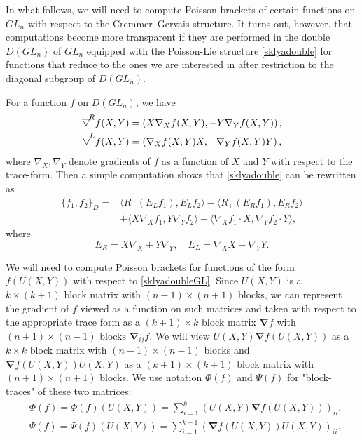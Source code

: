 \documentclass{amsart}
\theoremstyle{definition}
\theoremstyle{remark}
\numberwithin{equation}{section}
\numberwithin{theorem}{section}
\begin{document}
In what follows, we will need to compute Poisson brackets of certain functions
on $GL_n$ with respect to the Cremmer--Gervais structure. It turns out, however, that 
computations become more 
transparent if they are performed in the double $D(GL_n)$  of $GL_n$ equipped with 
the Poisson-Lie structure \eqref{sklyadouble} for functions that reduce to the ones we are interested in
after restriction to the diagonal subgroup of $D(GL_n)$.

For a function $f$ on $D(GL_n)$, we have 
\begin{eqnarray}\nonumber
{{\raisebox{2pt}{$\bigtriangledown$}}\negthinspace}^R f(X,Y) &=\left (X\nabla_X f(X,Y), -Y\nabla_Y f(X,Y)\right ), \\ \nonumber
 {{\raisebox{2pt}{$\bigtriangledown$}}\negthinspace}^L f(X,Y) &=\left (\nabla_X f(X,Y)X, -\nabla_Y f(X,Y)Y\right ),
\end{eqnarray}
where $\nabla_X, \nabla_Y$ denote gradients of $f$ as a function of $X$ and $Y$ with respect to the trace-form. 
Then a simple computation shows that \eqref{sklyadouble} can be rewritten
as
\begin{equation}\label{sklyadoubleGL}
\begin{split}
\{f_1,f_2\}_D = &\langle R_+(E_L f_1), E_L f_2\rangle -  \langle R_+(E_R f_1), E_R f_2\rangle\\
&+  \langle X\nabla_X  f_1, Y\nabla_Y f_2\rangle - \langle\nabla_X  f_1\cdot X, \nabla_Y f_2 \cdot Y\rangle,
\end{split}
\end{equation}
where
\[
E_R = X \nabla_X + Y\nabla_Y, \quad E_L =  \nabla_X X+ \nabla_Y Y.
\]

We will need to compute Poisson brackets for functions of the form
$f(U(X,Y))$ with respect to \eqref{sklyadoubleGL}. Since $U(X,Y)$ is a $k\times (k+1)$ block
matrix with $(n-1)\times (n+1)$ blocks, we can represent the gradient of $f$ viewed as a function on 
such matrices and taken with respect to the appropriate trace form as a $(k+1)\times k$ block
matrix  ${\boldsymbol\nabla} f$ with $(n+1)\times (n-1)$ blocks ${\boldsymbol\nabla}_{ij} f$. 
We will view $U(X,Y) {\boldsymbol\nabla} f(U(X,Y))$ as a $k\times k$ block matrix with $(n-1)\times (n-1)$ blocks
and ${\boldsymbol\nabla} f(U(X,Y)) U(X,Y)$ as a $(k+1)\times (k+1)$ block matrix with $(n+1)\times (n+1)$ blocks. 
We use notation ${\Phi}(f)$ and ${\Psi}(f)$ for "block-traces" of these two matrices:
\begin{equation}\label{blocktrace}
\begin{aligned} 
&{\Phi}(f)={\Phi}(f)(U(X,Y))=\sum_{i=1}^k \left ( U(X,Y) {\boldsymbol\nabla} f(U(X,Y)) \right )_{ii}, \\ 
&{\Psi}(f)={\Psi}(f)(U(X,Y))=\sum_{i=1}^{k+1} \left ( {\boldsymbol\nabla} f(U(X,Y))  U(X,Y)\right )_{ii}.
\end{aligned}
\end{equation}
\end{document}
